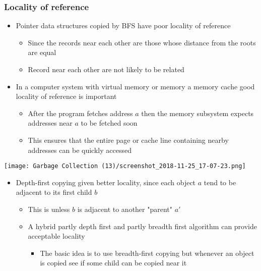 \documentclass[11pt]{article}
\begin{document}
\subsubsection{Locality of reference}
\label{sec:org6545893}
\begin{itemize}
\item Pointer data structures copied by BFS have poor locality of reference
\begin{itemize}
\item Since the records near each other are those whose distance from the roots are equal
\item Record near each other are not likely to be related
\end{itemize}

\item In a computer system with virtual memory or memory a memory cache good locality of reference is important
\begin{itemize}
\item After the program fetches address \(a\) then the memory subsystem expects addresses near \(a\) to be fetched soon
\item This ensures that the entire page or cache line containing nearby addresses can be quickly accessed
\end{itemize}
\end{itemize}

\begin{center}
\texttt{[image: Garbage Collection (13)/screenshot\_2018-11-25\_17-07-23.png]}
\end{center}
\begin{itemize}
\item Depth-first copying given better locality, since each object \(a\) tend to be adjacent to its first child \(b\)
\begin{itemize}
\item This is unless \(b\) is adjacent to another "parent" \(a'\)
\item A hybrid partly depth first and partly breadth first algorithm can provide acceptable locality
\begin{itemize}
\item The basic idea is to use breadth-first copying but whenever an object is copied see if some child can be copied near it
\end{itemize}
\end{itemize}
\end{itemize}
\end{document}
